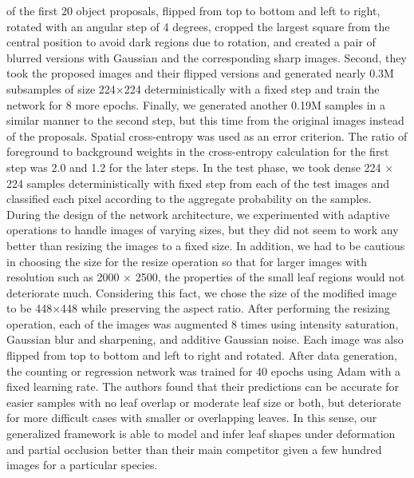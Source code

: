 of the first 20 object proposals, flipped from top to bottom and left to right, rotated with an angular step of 4 degrees, cropped the largest square from the central
position to avoid dark regions due to rotation, and created a pair of blurred versions with Gaussian and the corresponding sharp images. Second, they took the proposed
images and their flipped versions and generated nearly 0.3M subsamples of size 224×224 deterministically with a fixed step and train the network for 8 more epochs.
Finally, we generated another 0.19M samples in a similar manner to the second step, but this time from the original images instead of the proposals. Spatial
cross-entropy was used as an error criterion. The ratio of foreground to background weights in the cross-entropy calculation for the first step was 2.0 and 1.2
for the later steps. In the test phase, we took dense 224 × 224 samples deterministically with fixed step from each of the test images and classified each pixel
according to the aggregate probability on the samples. During the design of the network architecture, we experimented with adaptive operations to handle images
of varying sizes, but they did not seem to work any better than resizing the images to a fixed size. In addition, we had to be cautious in choosing the size for
the resize operation so that for larger images with resolution such as 2000 × 2500, the properties of the small leaf regions would not deteriorate much. Considering
this fact, we chose the size of the modified image to be 448×448 while preserving the aspect ratio. After performing the resizing operation, each of the images was
augmented 8 times using intensity saturation, Gaussian blur and sharpening, and additive Gaussian noise. Each image was also flipped from top to bottom and left to
right and rotated. After data generation, the counting or regression network was trained for 40 epochs using Adam with a fixed learning rate. The authors found that
their predictions can be accurate for easier samples with no leaf overlap or moderate leaf size or both, but deteriorate for more difficult cases with smaller or overlapping
leaves. In this sense, our generalized framework is able to model and infer leaf shapes under deformation and partial occlusion better than their main competitor given a
few hundred images for a particular species.




































